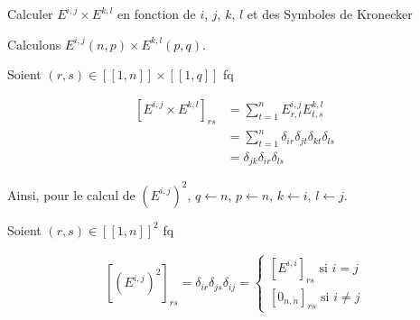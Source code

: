 \documentclass{article}
\date{02 Mars 2024}
\begin{document}
\maketitle
	
\begin{question_kholle}
	[]
	{Calculer $E^{i,j} \times E^{k,l}$ en fonction de $i$, $j$, $k$, $l$ et des Symboles de Kronecker}
			
	Calculons $E^{i,j}(n,p) \times E^{k,l}(p,q)$.
 
Soient $(r, s) \in [ \! [ 1, n] \!] \times [ \! [ 1, q ] \!]$ fq

\begin{align*}
\left[ E^{i,j} \times E^{k,l} \right] _{rs}  & = \sum_{t = 1}^{n}E^{i,j}_{r,t} E^{k,l}_{t,s} \\
 & =\sum_{t = 1}^{n} \delta_{ir} \delta_{jt} \delta_{kt} \delta_{ls} \\
 & = \delta_{jk} \delta_{ir} \delta_{ls}
\end{align*}


Ainsi, pour le calcul de $(E^{i,j})^{2}$, $q \leftarrow n$, $p \leftarrow n$, $k \leftarrow i$, $l \leftarrow j$.

Soient $(r, s) \in [ \! [ 1, n] \!]^{2}$ fq




\begin{align*}


\left[  (E^{i,j})^{2} \right]_{rs} = \delta_{ir} \delta_{js} \delta_{ij} = \left\{ 
\begin{array}{ll}
  \left[   E^{i,i} \right]_{rs} \text{ si } i = j  \\ 
  \left[ 0_{n,n} \right] _{rs} \text{ si } i \neq j 
\end{array}
\right.


\end{align*}

\end{question_kholle}
	
\end{document}
